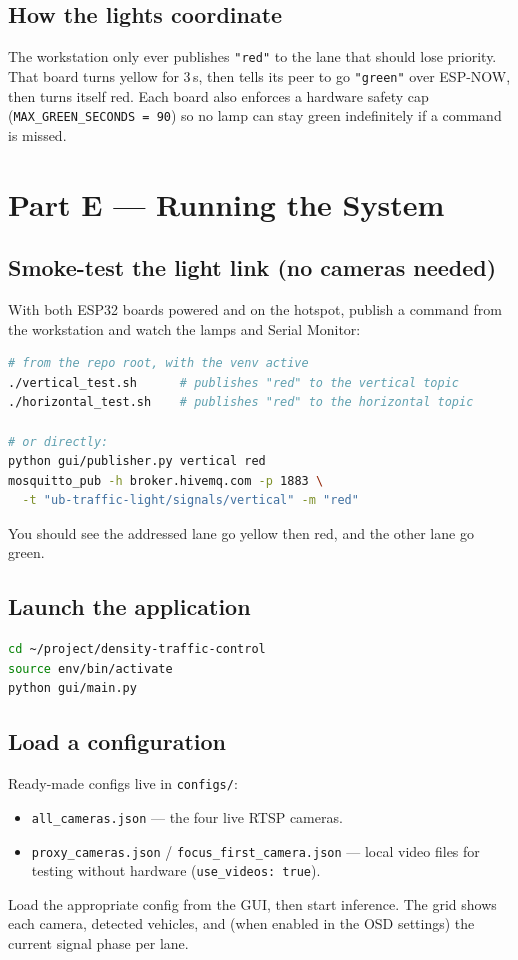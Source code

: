 \documentclass[11pt]{article}
\newcommand{\code}[1]{\texttt{#1}}
\begin{document}
\subsection{How the lights coordinate}
The workstation only ever publishes \code{"red"} to the lane that should lose
priority. That board turns yellow for 3\,s, then tells its peer to go
\code{"green"} over ESP-NOW, then turns itself red. Each board also enforces a
hardware safety cap (\code{MAX\_GREEN\_SECONDS = 90}) so no lamp can stay green
indefinitely if a command is missed.

\section{Part E --- Running the System}

\subsection{Smoke-test the light link (no cameras needed)}
With both ESP32 boards powered and on the hotspot, publish a command from the
workstation and watch the lamps and Serial Monitor:
\begin{lstlisting}[language=bash]
# from the repo root, with the venv active
./vertical_test.sh      # publishes "red" to the vertical topic
./horizontal_test.sh    # publishes "red" to the horizontal topic

# or directly:
python gui/publisher.py vertical red
mosquitto_pub -h broker.hivemq.com -p 1883 \
  -t "ub-traffic-light/signals/vertical" -m "red"
\end{lstlisting}
You should see the addressed lane go yellow then red, and the other lane go
green.

\subsection{Launch the application}
\begin{lstlisting}[language=bash]
cd ~/project/density-traffic-control
source env/bin/activate
python gui/main.py
\end{lstlisting}

\subsection{Load a configuration}
Ready-made configs live in \code{configs/}:
\begin{itemize}[nosep]
  \item \code{all\_cameras.json} --- the four live RTSP cameras.
  \item \code{proxy\_cameras.json} / \code{focus\_first\_camera.json} ---
        local video files for testing without hardware
        (\code{use\_videos: true}).
\end{itemize}
Load the appropriate config from the GUI, then start inference. The grid shows
each camera, detected vehicles, and (when enabled in the OSD settings) the
current signal phase per lane.
\end{document}

